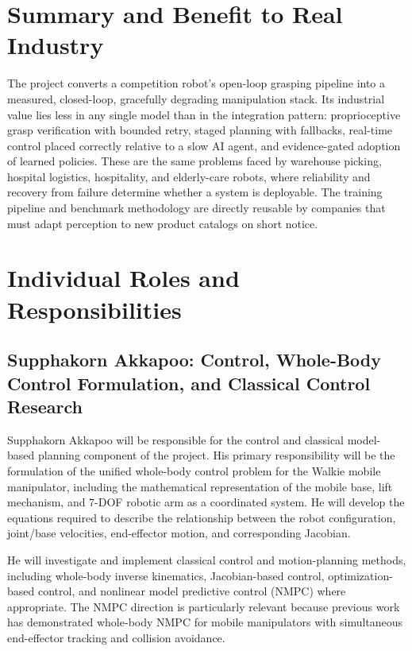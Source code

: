 \documentclass[12pt,a4paper]{article}
\begin{document}
\section*{Summary and Benefit to Real Industry}

The project converts a competition robot's open-loop grasping pipeline into a measured,
closed-loop, gracefully degrading manipulation stack. Its industrial value lies less in any single
model than in the integration pattern: proprioceptive grasp verification with bounded retry,
staged planning with fallbacks, real-time control placed correctly relative to a slow AI agent, and
evidence-gated adoption of learned policies. These are the same problems faced by warehouse
picking, hospital logistics, hospitality, and elderly-care robots, where reliability and recovery
from failure determine whether a system is deployable. The training pipeline and benchmark
methodology are directly reusable by companies that must adapt perception to new product
catalogs on short notice.

\newpage
\section*{Individual Roles and Responsibilities}

\subsection*{Supphakorn Akkapoo: Control, Whole-Body Control Formulation, and Classical Control Research}

Supphakorn Akkapoo will be responsible for the control and classical model-based
planning component of the project. His primary responsibility will be the formulation of the
unified whole-body control problem for the Walkie mobile manipulator, including the
mathematical representation of the mobile base, lift mechanism, and 7-DOF robotic arm as a
coordinated system. He will develop the equations required to describe the relationship
between the robot configuration, joint/base velocities, end-effector motion, and corresponding
Jacobian.

He will investigate and implement classical control and motion-planning methods,
including whole-body inverse kinematics, Jacobian-based control, optimization-based control,
and nonlinear model predictive control (NMPC) where appropriate. The NMPC direction is
particularly relevant because previous work has demonstrated whole-body NMPC for mobile
manipulators with simultaneous end-effector tracking and collision avoidance.
\end{document}
